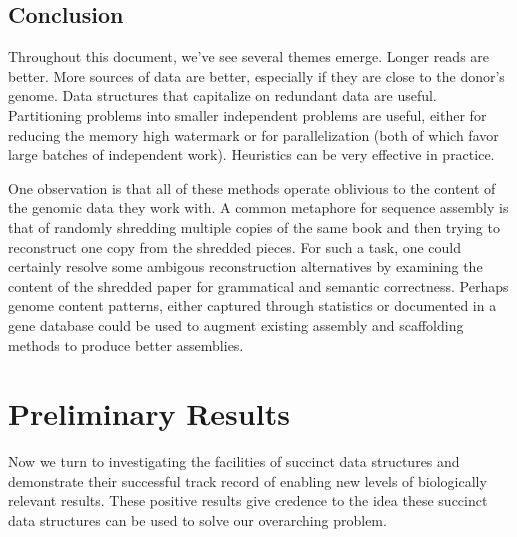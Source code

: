 \documentclass[doctor]{thesis}
\begin{document}





 

\makeatletter{}\section{Conclusion}

Throughout this document, we've see several themes emerge.  Longer reads are better.  More sources of data are better, especially if they are close to the donor's genome.  Data structures that capitalize on redundant data are useful.  Partitioning problems into smaller independent problems are useful, either for reducing the memory high watermark or for parallelization (both of which favor large batches of independent work).  Heuristics can be very effective in practice.

One observation is that all of these methods operate oblivious to the content of the genomic data they work with.  A common metaphore for sequence assembly is that of randomly shredding multiple copies of the same book and then trying to reconstruct one copy from the shredded pieces.  For such a task, one could certainly resolve some ambigous reconstruction alternatives by examining the content of the shredded paper for grammatical and semantic correctness.  Perhaps genome content patterns, either captured through statistics or documented in a gene database could be used to augment existing assembly and scaffolding methods to produce better assemblies.


\chapter{Preliminary Results}
Now we turn to investigating the facilities of succinct data structures and demonstrate their successful track record of enabling new levels of biologically relevant results.  These positive results give credence to the idea these succinct data structures can be used to solve our overarching problem.
\end{document}
